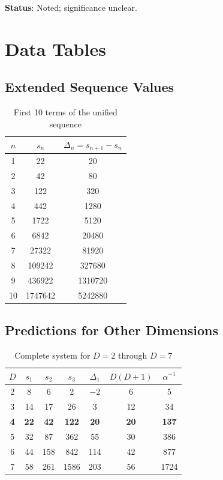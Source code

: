 \documentclass[12pt,a4paper]{article}
\begin{document}
\textbf{Status}: Noted; significance unclear.

\section{Data Tables}

\subsection{Extended Sequence Values}

\begin{table}[h]
\centering
\caption{First 10 terms of the unified sequence}
\begin{tabular}{ccc}
\hline
$n$ & $s_n$ & $\Delta_n = s_{n+1} - s_n$ \\
\hline
1 & 22 & 20 \\
2 & 42 & 80 \\
3 & 122 & 320 \\
4 & 442 & 1280 \\
5 & 1722 & 5120 \\
6 & 6842 & 20480 \\
7 & 27322 & 81920 \\
8 & 109242 & 327680 \\
9 & 436922 & 1310720 \\
10 & 1747642 & 5242880 \\
\hline
\end{tabular}
\end{table}

\subsection{Predictions for Other Dimensions}

\begin{table}[h]
\centering
\caption{Complete system for $D = 2$ through $D = 7$}
\begin{tabular}{ccccccc}
\hline
$D$ & $s_1$ & $s_2$ & $s_3$ & $\Delta_1$ & $D(D+1)$ & $\alpha^{-1}$ \\
\hline
2 & 8 & 6 & 2 & $-2$ & 6 & 5 \\
3 & 14 & 17 & 26 & 3 & 12 & 34 \\
\textbf{4} & \textbf{22} & \textbf{42} & \textbf{122} & \textbf{20} & \textbf{20} & \textbf{137} \\
5 & 32 & 87 & 362 & 55 & 30 & 386 \\
6 & 44 & 158 & 842 & 114 & 42 & 877 \\
7 & 58 & 261 & 1586 & 203 & 56 & 1724 \\
\hline
\end{tabular}
\end{table}
\end{document}
